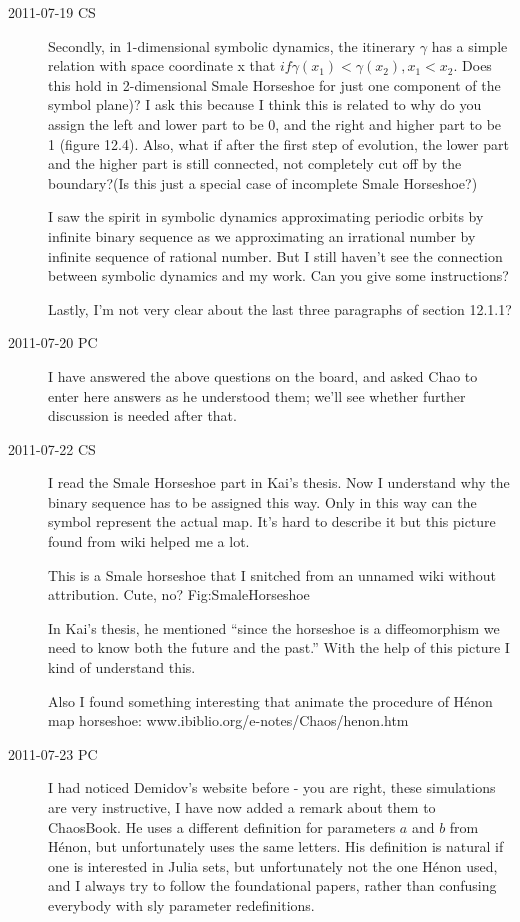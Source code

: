 \begin{description}
\item[2011-07-19 CS]
Secondly, in 1-dimensional symbolic dynamics, the itinerary $\gamma$ has a
simple relation with space coordinate x that $if \gamma(x_1) <
\gamma(x_2), x_1<x_2$. Does this hold in 2-dimensional Smale Horseshoe
for just one component of the symbol plane)? I ask this because I think
this is related to why do you assign the left and lower part to be 0, and
the right and higher part to be 1 (figure 12.4). Also, what if after the
first step of evolution, the lower part and the higher part is still
connected, not completely cut off by the boundary?(Is this just a special
case of incomplete Smale Horseshoe?)

I saw the spirit in symbolic dynamics approximating periodic orbits by
infinite binary sequence as we approximating an irrational number by
infinite sequence of rational number. But I still haven't see the
connection between symbolic dynamics and my work. Can you give some
instructions?

Lastly, I'm not very clear about the last three paragraphs of section
12.1.1?

\item[2011-07-20 PC] I have answered the above questions on the board,
and asked Chao to enter here answers as he understood them; we'll see
whether further discussion is needed after that.

\item[2011-07-22 CS] I read the Smale Horseshoe part in Kai's thesis. Now
I understand why the binary sequence has to be assigned this way. Only in
this way can the symbol represent the actual map. It's hard to describe
it but this picture found from wiki helped me a lot.

{}{
This is a Smale horseshoe that I snitched from an unnamed wiki
without attribution. Cute, no?
    }{Fig:SmaleHorseshoe}

In Kai's thesis, he mentioned ``since the horseshoe is a diffeomorphism
we need to know both the future and the past.'' With the help of this
picture I kind of understand this.

Also I found something interesting that animate the procedure of H\'enon
map horseshoe:
{www.ibiblio.org/e-notes/Chaos/henon.htm}

\item[2011-07-23 PC]                                        \inCB
I had noticed Demidov's website before - you are right, these simulations
are very instructive, I have now added a remark about them to ChaosBook.
He uses a different definition for parameters $a$ and $b$ from H\'enon,
but unfortunately uses the same letters. His definition is natural if one
is interested in Julia sets, but unfortunately not the one H\'enon used,
and I always try to follow the foundational papers, rather than confusing
everybody with sly parameter redefinitions.


\end{description}
